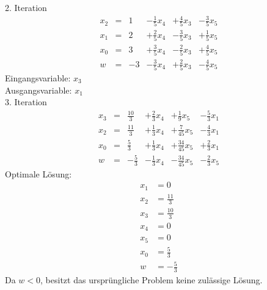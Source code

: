 \documentclass[a4paper]{scrartcl}
\begin{document}
\begin{enumerate}
\begin{enumerate}
                2. Iteration
                \begin{equation}
                    \begin{array}{rcrrrr}
                        x_2 & = & 1 & -\frac{1}{5}x_4 & +\frac{4}{5}x_3 & -\frac{3}{5}x_5 \\
                        x_1 & = & 2 & +\frac{2}{5}x_4 & -\frac{3}{5}x_3 & +\frac{1}{5}x_5 \\
                        x_0 & = & 3 & +\frac{3}{5}x_4 & -\frac{2}{5}x_3 & +\frac{4}{5}x_5 \\
                        \hline
                        w   & = & -3 & -\frac{3}{5}x_4 & +\frac{2}{5}x_3 & -\frac{4}{5}x_5
                    \end{array}
                \end{equation}
                Eingangsvariable: $x_3$ \\
                Ausgangsvariable: $x_1$ \\

                3. Iteration
                \begin{equation}
                    \begin{array}{rcrrrr}
                        x_3 & = & \frac{10}{3} & +\frac{2}{3}x_4 & +\frac{1}{9}x_5 & -\frac{5}{3}x_1 \\
                        x_2 & = & \frac{11}{3} & +\frac{1}{3}x_4 & +\frac{7}{45}x_5 & -\frac{4}{3}x_1 \\
                        x_0 & = & \frac{5}{3} & +\frac{1}{3}x_4 & +\frac{34}{45}x_5 & +\frac{2}{3}x_1 \\
                        \hline
                        w   & = & -\frac{5}{3} & -\frac{1}{3}x_4 & -\frac{34}{45}x_5 & -\frac{2}{3}x_5
                    \end{array}
                \end{equation}
                Optimale Lösung:
                \begin{equation}
                    \begin{split}
                        x_1 &= 0 \\
                        x_2 &= \frac{11}{3} \\
                        x_3 &= \frac{10}{3} \\
                        x_4 &= 0 \\
                        x_5 &= 0 \\
                        x_0 &= \frac{5}{3} \\
                        w   &= -\frac{5}{3}
                    \end{split}
                \end{equation}
                Da $w < 0$, besitzt das ursprüngliche Problem keine zulässige Lösung.

        \end{enumerate}


\end{enumerate}
\end{document}
